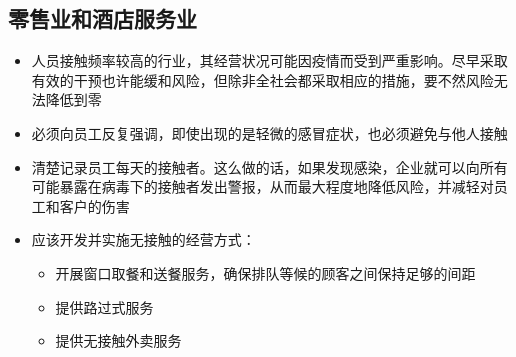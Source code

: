 \documentclass[onecolumn,journal]{IEEEtran}
\begin{document}
\begin{multicols}{2}
\section*{零售业和酒店服务业}
\begin{itemize}
\item 人员接触频率较高的行业，其经营状况可能因疫情而受到严重影响。尽早采取有效的干预也许能缓和风险，但除非全社会都采取相应的措施，要不然风险无法降低到零
\item 必须向员工反复强调，即使出现的是轻微的感冒症状，也必须避免与他人接触
\item 清楚记录员工每天的接触者。这么做的话，如果发现感染，企业就可以向所有可能暴露在病毒下的接触者发出警报，从而最大程度地降低风险，并减轻对员工和客户的伤害
\item 应该开发并实施无接触的经营方式：
  \begin{itemize}
    \item 开展窗口取餐和送餐服务，确保排队等候的顾客之间保持足够的间距
    \item 提供路过式服务
    \item 提供无接触外卖服务
  \end{itemize}
\end{itemize}


\end{multicols}

\vspace{2ex}







% 

\end{document}
